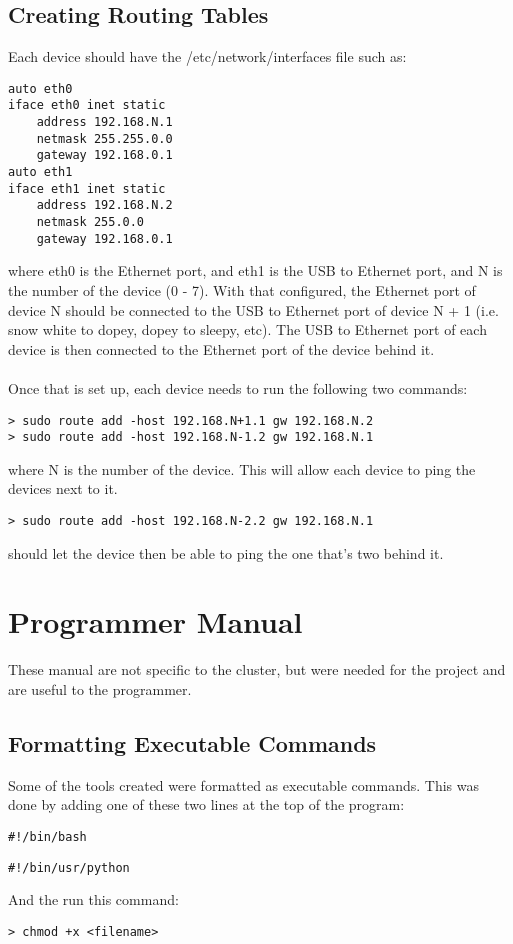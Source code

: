 \subsection{Creating Routing Tables}
Each device should have the /etc/network/interfaces file such as: \\
\begin{lstlisting}
auto eth0
iface eth0 inet static
	address 192.168.N.1
	netmask 255.255.0.0
	gateway 192.168.0.1
auto eth1
iface eth1 inet static 
	address 192.168.N.2
	netmask 255.0.0
	gateway 192.168.0.1
\end{lstlisting}
where eth0 is the Ethernet port, and eth1 is the USB to Ethernet port, and N is the number of the device (0 - 7). With that configured, the Ethernet port of device N should be connected to the USB to Ethernet port of device N + 1 (i.e. snow white to dopey, dopey to sleepy, etc). The USB to Ethernet port of each device is then connected to the Ethernet port of the device behind it. \\ \\
Once that is set up, each device needs to run the following two commands:
\begin{lstlisting}
> sudo route add -host 192.168.N+1.1 gw 192.168.N.2
> sudo route add -host 192.168.N-1.2 gw 192.168.N.1
\end{lstlisting}
where N is the number of the device. This will allow each device to ping the devices next to it. 
\begin{lstlisting}
> sudo route add -host 192.168.N-2.2 gw 192.168.N.1
\end{lstlisting}
should let the device then be able to ping the one that's two behind it. 

\section{Programmer Manual}
These manual are not specific to the cluster, but were needed for the project and are useful to the programmer.
\subsection{Formatting Executable Commands}
Some of the tools created were formatted as executable commands. This was done by adding one of these two lines at the top of the program:
\begin{lstlisting}
#!/bin/bash
\end{lstlisting}
\begin{lstlisting}
#!/bin/usr/python
\end{lstlisting}
And the run this command:
\begin{lstlisting}
> chmod +x <filename>
\end{lstlisting}

